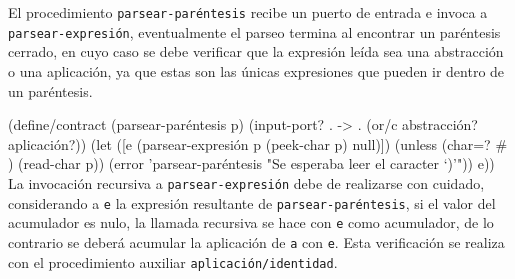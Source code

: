 \documentclass[10pt,oneside,openany,letterpaper]{book}
\begin{document}
El procedimiento {\tt{}\protect{}parsear\protect{}-paréntesis} recibe un puerto de entrada e invoca a {\tt{}\protect{}parsear\protect{}-expresión}, eventualmente el parseo termina al encontrar un paréntesis cerrado, en cuyo caso se debe verificar que la expresión leída sea una abstracción o una aplicación, ya que estas son las únicas expresiones que pueden ir dentro de un paréntesis.

\nwenddocs{}\plusendmoddef
(define/contract (parsear-paréntesis p)
  (input-port? . -> . (or/c abstracción? aplicación?))
  (let ([e (parsear-expresión p (peek-char p) null)])
    (unless (char=? #\\) (read-char p))
      (error 'parsear-paréntesis "Se esperaba leer el caracter `)'"))
    e))
\eatline
{}\nwendcode{}\nwdocspar
La invocación recursiva a {\tt{}\protect{}parsear\protect{}-expresión} debe de realizarse con cuidado, considerando a {\tt{}e} la expresión resultante de {\tt{}\protect{}parsear\protect{}-paréntesis}, si el valor del acumulador es nulo, la llamada recursiva se hace con {\tt{}e} como acumulador, de lo contrario se deberá acumular la aplicación de {\tt{}a} con {\tt{}e}. Esta verificación se realiza con el procedimiento auxiliar {\tt{}\protect{}aplicación\protect{}/identidad}.
\end{document}
